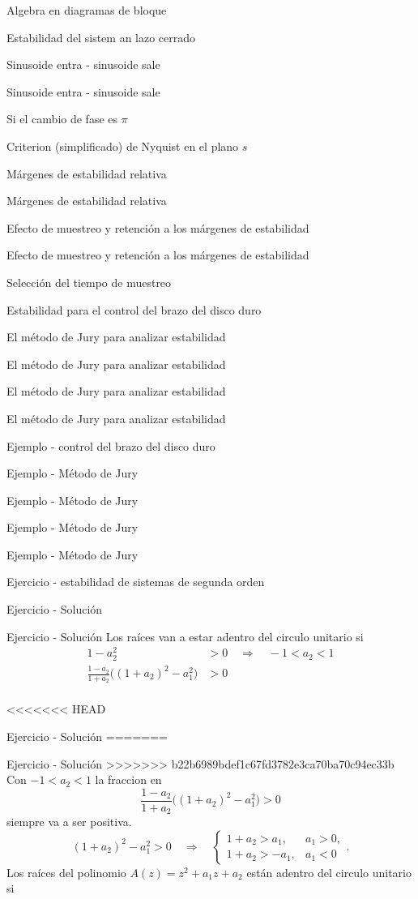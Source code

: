 \documentclass[presentation,aspectratio=169]{beamer}
\begin{document}
\begin{frame}[label={sec:org8e8e439}]{Algebra en diagramas de bloque}
\begin{frame}[label={sec:org5218f19}]{Estabilidad del sistem an lazo cerrado}
\begin{frame}[label={sec:org4ce2307}]{Sinusoide entra - sinusoide sale}
\begin{frame}[label={sec:orgc598966}]{Sinusoide entra - sinusoide sale}
\begin{frame}[label={sec:orgbd54147}]{Si el cambio de fase es \(\pi\)}
\begin{frame}[label={sec:orgf06388b}]{Criterion (simplificado) de Nyquist en el plano \(s\)}
\begin{frame}[label={sec:org5967884}]{Márgenes de estabilidad relativa}
\begin{frame}[label={sec:orgb5ba0e3}]{Márgenes de estabilidad relativa}
\begin{frame}[label={sec:orga8344a9}]{Efecto de muestreo y retención a los márgenes de estabilidad}
\begin{frame}[label={sec:org5e3653d}]{Efecto de muestreo y retención a los márgenes de estabilidad}
\begin{frame}[label={sec:orgd9a9d5d}]{Selección del tiempo de muestreo}
\begin{frame}[label={sec:org2cdebfb}]{Estabilidad para el control del brazo del disco duro}
\begin{frame}[label={sec:org6242817}]{El método de Jury para analizar estabilidad}
\begin{frame}[label={sec:org7c040d1}]{El método de Jury para analizar estabilidad}
\begin{frame}[label={sec:org85b11cd}]{El método de Jury para analizar estabilidad}
\begin{frame}[label={sec:org8bd183d}]{El método de Jury para analizar estabilidad}
\begin{frame}[label={sec:org4ec96eb}]{Ejemplo - control del brazo del disco duro}
\begin{frame}[label={sec:orgd803867}]{Ejemplo - Método de Jury}
\begin{frame}[label={sec:org8c0436d}]{Ejemplo - Método de Jury}
\begin{frame}[label={sec:org7f8ec49}]{Ejemplo - Método de Jury}
\begin{frame}[label={sec:org3031e62}]{Ejemplo - Método de Jury}
\begin{frame}[label={sec:org228180a}]{Ejercicio - estabilidad de sistemas de segunda orden}
\begin{frame}[label={sec:orgef5d44f}]{Ejercicio - Solución}
\begin{frame}[label={sec:org1be679a}]{Ejercicio - Solución}
Los raíces van a estar adentro del circulo unitario si
\begin{align*}
  1 - a_2^2 &> 0 \quad \Rightarrow \quad -1 < a_2 < 1\\
  \frac{1-a_2}{1+a_2} \big((1+a_2)^2 - a_1^2\big) &> 0\\
\end{align*}
\end{frame}

<<<<<<< HEAD
\begin{frame}[label={sec:orge98726a}]{Ejercicio - Solución}
=======
\begin{frame}[label={sec:orgc054660}]{Ejercicio - Solución}
>>>>>>> b22b6989bdef1c67fd3782e3ca70ba70c94ec33b
   Con \(-1 < a_2 < 1\) la fraccion en 
   \[\frac{1-a_2}{1+a_2} \big((1+a_2)^2 - a_1^2\big) > 0\]
   siempre va a ser positiva.
   \[(1+a_2)^2 - a_1^2 > 0 \quad \Rightarrow \quad \begin{cases} 1+a_2 > a_1, & a_1 > 0,\\ 1 + a_2 > -a_1, & a_1 < 0 \end{cases}. \]
Los raíces del polinomio \(A(z) = z^2 + a_1z + a_2\) están adentro del circulo unitario si

\end{frame}
\end{frame}
\end{frame}
\end{frame}
\end{frame}
\end{frame}
\end{frame}
\end{frame}
\end{frame}
\end{frame}
\end{frame}
\end{frame}
\end{frame}
\end{frame}
\end{frame}
\end{frame}
\end{frame}
\end{frame}
\end{frame}
\end{frame}
\end{frame}
\end{frame}
\end{frame}
\end{frame}
\end{frame}
\end{document}
